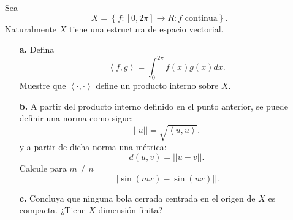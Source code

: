 \documentclass{report}
\begin{document}
Sea \[
X = \left\{ f:\left[ 0, 2\pi \right] \to R: \text{$f$ continua} \right\} 
.\] Naturalmente $X$ tiene una estructura de espacio vectorial.
\begin{enumerate}
  \item[\textbf{a.}] Defina \[
      \left<f, g \right> = \int_0^{2\pi}f\left( x \right) g\left( x \right) dx	
    .\] Muestre que $\left< \cdot, \cdot\right>$ define un producto interno sobre $X$.
  \item[\textbf{b.}] A partir del producto interno definido en el punto anterior, se puede definir una norma como sigue: \[
      \left| \left| u \right|  \right|  = \sqrt{\left<u, u \right>} 
      .\] y a partir de dicha norma una métrica: \[
      d(u, v) =  \left| \left| u - v \right|  \right| 
      .\] Calcule para $m \neq n$ \[
      \left| \left| \sin\left( mx \right) - \sin\left( nx \right)  \right|  \right| 
    .\] 
  \item[\textbf{c.}] Concluya que ninguna bola cerrada centrada en el origen de $X$ es compacta. ¿Tiene $X$ dimensión finita?
\end{enumerate}
\end{document}
